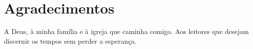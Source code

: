 \chapter*{Agradecimentos}
A Deus, à minha família e à igreja que caminha comigo. Aos leitores que desejam discernir os tempos sem perder a esperança.
